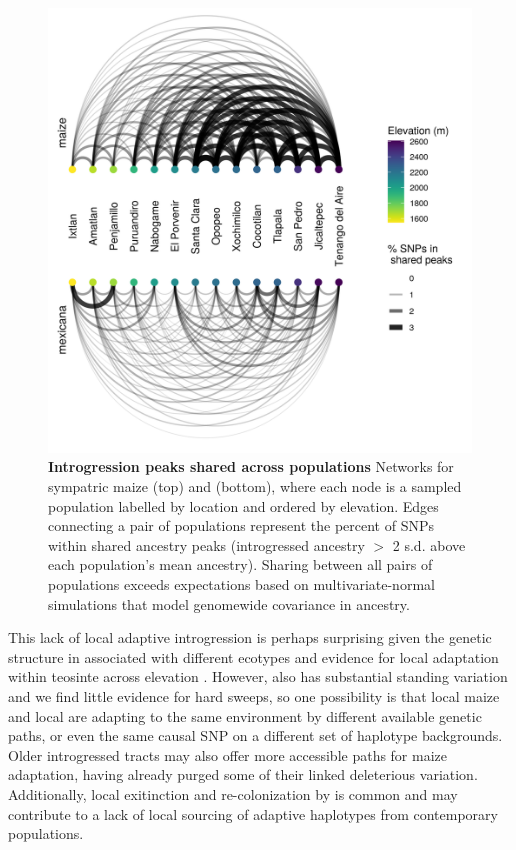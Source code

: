 \begin{figure}[ht]
\includegraphics[width=.9\textwidth]{chapter2/figures/network_peak_sharing_data_only.png}
\caption{\color{Gray} \textbf{Introgression peaks shared across populations} Networks for sympatric maize (top) and \mexicana (bottom), where each node is a sampled population labelled by location and ordered by elevation. 
Edges connecting a pair of populations represent the percent of SNPs within shared ancestry peaks (introgressed ancestry $>$ 2 s.d. above each population's mean ancestry). 
Sharing between all pairs of populations exceeds expectations based on multivariate-normal simulations that model genomewide covariance in ancestry.
}
\label{network_peaks}
\end{figure}

This lack of local adaptive introgression is perhaps surprising given the genetic structure in \mexicana associated with different ecotypes \cite{Fukunaga:2005fx} and evidence for local adaptation within teosinte across elevation \cite{ Pyhajarvi:2013jc, Fustier:2019, OBrien:2019}. However, \mexicana also has substantial standing variation and we find little evidence for hard sweeps, so one possibility is that local maize and local \mexicana are adapting to the same environment by different available genetic paths, or even the same causal SNP on a different set of haplotype backgrounds. Older introgressed tracts may also offer more accessible paths for maize adaptation, having already purged some of their linked deleterious variation. Additionally, local exitinction and re-colonization by \mexicana is common \cite{Wilkes:1967} and may contribute to a lack of local sourcing of adaptive haplotypes from contemporary \mexicana populations.



